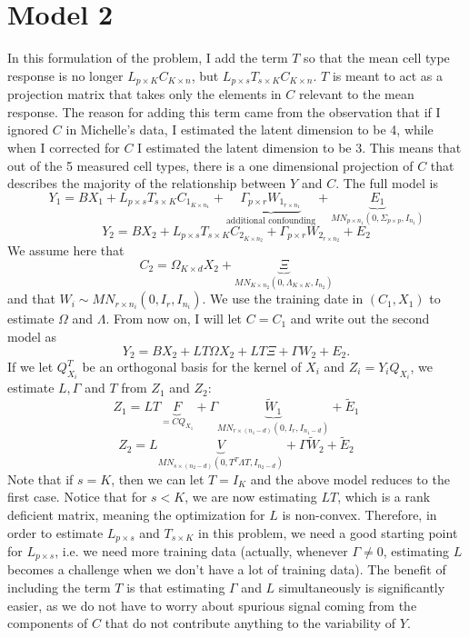 \documentclass{article}
\begin{document}
\section{Model 2}
In this formulation of the problem, I add  the term $T$ so that the mean cell type response is no longer $L_{p \times K}C_{K \times n}$, but $L_{p \times s}T_{s \times K}C_{K \times n}$. $T$ is meant to act as a projection matrix that takes only the elements in $C$ relevant to the mean response. The reason for adding this term came from the observation that if I ignored $C$ in Michelle's data, I estimated the latent dimension to be 4, while when I corrected for $C$ I estimated the latent dimension to be 3. This means that out of the 5 measured cell types, there is a one dimensional projection of $C$ that describes the majority of the relationship between $Y$ and $C$. The full model is
\[
Y_1 = BX_1 + L_{p \times s} T_{s \times K} C_{1_{K \times n_1}} + \underbrace{\Gamma_{p \times r}W_{1_{r \times n_1}}}_{\text{additional confounding}} + \underbrace{E_1}_{MN_{p \times n_1}\left( 0, \Sigma_{p \times p}, I_{n_1} \right)}
\]
\[
Y_2 = BX_2 +  L_{p \times s} T_{s \times K} C_{2_{K \times n_2}} + \Gamma_{p \times r}W_{2_{r \times n_2}} + E_2
\]
We assume here that
\[
C_2 = \Omega_{K \times d}X_2 + \underbrace{\Xi}_{MN_{K \times n_2}\left( 0, \Lambda_{K \times K}, I_{n_2} \right)}
\]
and that $W_i \sim MN_{r \times n_i}\left( 0, I_{r}, I_{n_i} \right)$. We use the training date in $\left( C_1, X_1 \right)$ to estimate $\Omega$ and $\Lambda$. From now on, I will let $C = C_1$ and write out the second model as
\[
Y_2 = BX_2 + LT\Omega X_2 + LT\Xi + \Gamma W_{2} + E_2.
\]
If we let $Q_{X_i}^T$ be an orthogonal basis for the kernel of $X_i$ and $Z_i = Y_i Q_{X_i}$, we estimate $L, \Gamma$ and $T$ from $Z_1$ and $Z_2$:
\[
Z_1 = LT\underbrace{F}_{=CQ_{X_1}} + \Gamma \underbrace{\tilde{W}_1}_{MN_{r \times \left( n_1 - d \right)}\left( 0, I_r, I_{n_1-d} \right)} + \tilde{E}_1
\]
\[
Z_2 = L\underbrace{V}_{MN_{s \times \left( n_2-d \right)}\left( 0, T^T \Lambda T, I_{n_2-d} \right)} + \Gamma \tilde{W}_2 + \tilde{E}_2
\]
Note that if $s = K$, then we can let $T = I_K$ and the above model reduces to the first case. Notice that for $s < K$, we are now estimating $LT$, which is a rank deficient matrix, meaning the optimization for $L$ is non-convex. Therefore, in order to estimate $L_{p \times s}$ and $T_{s \times K}$ in this problem, we need a good starting point for $L_{p \times s}$, i.e. we need more training data (actually, whenever $\Gamma \neq 0$, estimating $L$ becomes a challenge when we don't have a lot of training data). The benefit of including the term $T$ is that estimating $\Gamma$ and $L$ simultaneously is significantly easier, as we do not have to worry about spurious signal coming from the components of $C$ that do not contribute anything to the variability of $Y$.
\end{document}
